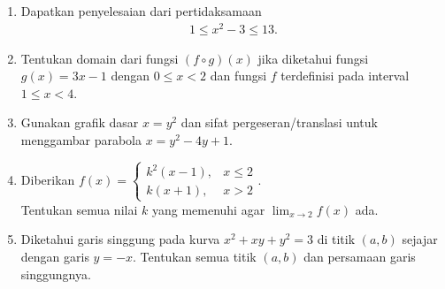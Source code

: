 \documentclass[10pt,openany,a4paper]{article}
\theoremstyle{definition}
\theoremstyle{definition}
\theoremstyle{plain}
\begin{document}
\begin{enumerate}
    \item Dapatkan penyelesaian dari pertidaksamaan
    \begin{align*}
        1\leq x^2-3\leq 13.
    \end{align*}

    \item Tentukan domain dari fungsi $(f\circ g)(x)$ jika diketahui fungsi $g(x)=3x-1$ dengan $0\leq x<2$ dan fungsi $f$ terdefinisi pada interval $1\leq x<4$.

    \item Gunakan grafik dasar $x=y^2$ dan sifat pergeseran/translasi untuk menggambar parabola $x=y^2-4y+1$.

    \item Diberikan $f(x)=\begin{cases}
        k^2(x-1), & x\leq 2\\
        k(x+1), & x>2
    \end{cases}$.\\
    Tentukan semua nilai $k$ yang memenuhi agar $\displaystyle\lim_{x\to 2}f(x)$ ada.

    \item Diketahui garis singgung pada kurva $x^2+xy+y^2=3$ di titik $(a,b)$ sejajar dengan garis $y=-x$. Tentukan semua titik $(a,b)$ dan persamaan garis singgungnya.
\end{enumerate}

\newpage
\end{document}

